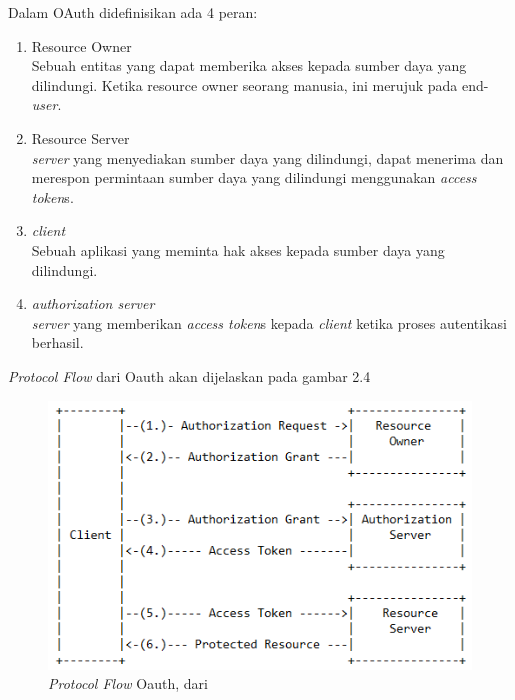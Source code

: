 Dalam OAuth didefinisikan ada 4 peran:
\begin{enumerate}
	\item Resource Owner\\
	Sebuah entitas yang dapat memberika akses kepada sumber daya yang dilindungi. Ketika resource owner seorang manusia, ini merujuk pada end-\textit{user}.
	\item Resource Server\\
	\textit{server}  yang menyediakan sumber daya yang dilindungi, dapat menerima dan merespon permintaan sumber daya yang dilindungi menggunakan \textit{access token}s.
	\item \textit{client}\\
	Sebuah aplikasi yang meminta hak akses kepada sumber daya yang dilindungi.
	\item \textit{authorization server}\\
	\textit{server}  yang memberikan \textit{access token}s kepada \textit{client} ketika proses autentikasi berhasil.
\end{enumerate}
\textit{Protocol Flow} dari Oauth akan dijelaskan pada gambar 2.4\\
\begin{figure}
\centering
\includegraphics[width=0.8\linewidth]{Gambar/mine/OAuth}
\caption[\textit{Protocol Flow} Oauth, dari \cite{RFCOAuth:2012}]{\textit{Protocol Flow} Oauth, dari \cite{RFCOAuth:2012}} 
\label{fig:oauth_flow_protocol}
\end{figure}
